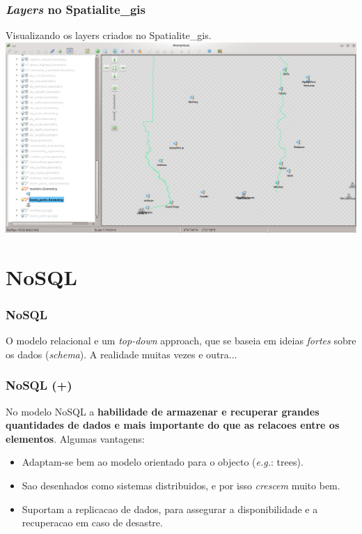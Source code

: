 \documentclass[hyperref={pdfpagelabels=true}]{beamer}
\begin{document}
\begin{frame}
\frametitle{\textit{Layers} no Spatialite\_gis}
Visualizando os layers criados no Spatialite\_gis.\\
\includegraphics[scale=0.3]{distance13.png}
\end{frame}

\section{NoSQL}
\begin{frame}
\frametitle{NoSQL}
\pause
O modelo relacional e um \textit{top-down} approach, que se baseia em ideias \textit{fortes} sobre os dados (\textit{schema}). A realidade muitas vezes e outra...\\
\end{frame}

\begin{frame}
\frametitle{NoSQL (+)}
No modelo NoSQL a \textbf{habilidade de armazenar e recuperar grandes quantidades de dados e mais importante do que as relacoes entre os elementos}. Algumas vantagens:
  \begin{itemize}
      \item<2-> Adaptam-se bem ao modelo orientado para o objecto (\textit{e.g.}: trees).
      \item<2-> Sao desenhados como sistemas distribuidos, e por isso \textit{crescem} muito bem. %
      \item<2-> Suportam a replicacao de dados, para assegurar a disponibilidade e a recuperacao em caso de desastre.
  \end{itemize}
\end{frame}
\end{document}
